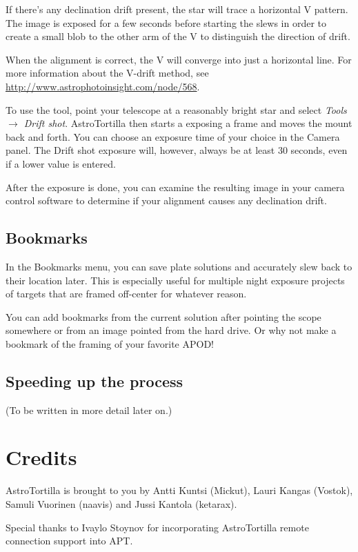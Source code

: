 \documentclass[english]{article}
\newcommand{\surl}[1]{{\small \url{#1}}}
\begin{document}
If there's any declination drift present, the star will trace a horizontal V
pattern. The image is exposed for a few seconds before starting the slews in
order to create a small blob to the other arm of the V to distinguish the
direction of drift.

When the alignment is correct, the V will converge into just a horizontal line.
For more information about the V-drift method, see
\surl{http://www.astrophotoinsight.com/node/568}.

To use the tool, point your telescope at a reasonably bright star and select
\emph{Tools $\rightarrow$ Drift shot}.  AstroTortilla then starts a exposing 
a frame and moves the mount back and forth. You can choose an exposure time of 
your choice in the Camera panel. The Drift shot exposure will, however, always 
be at least 30 seconds, even if a lower value is entered.

After the exposure is done, you can examine the resulting image in your camera 
control software to determine if your alignment causes any declination drift.

\subsection{Bookmarks}

In the Bookmarks menu, you can save plate solutions and accurately slew back to their location later. 
This is especially useful for multiple night exposure projects of targets that are framed off-center for whatever reason.

You can add bookmarks from the current solution after pointing the scope somewhere or from an image pointed from the hard drive. Or why not make a bookmark of the framing of your favorite APOD!

\subsection{Speeding up the process}

(To be written in more detail later on.)

\newpage

\section{Credits}

AstroTortilla is brought to you by Antti Kuntsi (Mickut), Lauri Kangas (Vostok), Samuli Vuorinen (naavis) and Jussi Kantola (ketarax). 

Special thanks to Ivaylo Stoynov for incorporating AstroTortilla remote connection support into APT.

\end{document}
